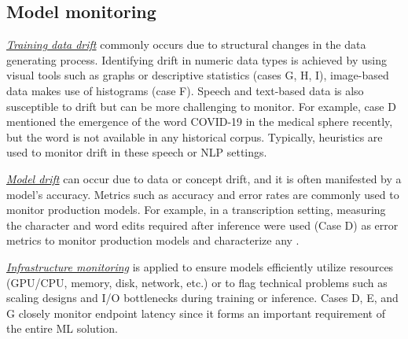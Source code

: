 

\subsection{Model monitoring} 

\underline{\emph{Training data drift}} commonly occurs due to structural changes in the data generating process. Identifying drift in numeric data types is \DIFdelbegin {}\DIFdelend achieved by using visual tools such as graphs or descriptive statistics (cases G, H, I), image-based data makes use of histograms (case F). Speech and text-based data is also susceptible to drift but can be more challenging to monitor. For example, case D mentioned the emergence of the word COVID-19 in the medical sphere recently, but the word is not available in any historical corpus. Typically, heuristics are used to monitor drift in these speech or NLP settings.

\underline{\emph{Model drift}} can occur due to data or concept drift, and it is often manifested by a \DIFdelbegin {}\DIFdelend model's \DIFaddbegin {}\DIFaddend accuracy. Metrics such as accuracy and error rates are commonly used to monitor production models. For example, in a transcription setting, measuring the character and word edits required after inference were used (Case D) as error metrics to monitor production models and characterize any \DIFdelbegin {}\DIFdelend \DIFaddbegin {}\DIFaddend .

\underline{\emph{Infrastructure monitoring}}
is applied to ensure models efficiently utilize resources (GPU/CPU, memory, disk, network, etc.) or to flag technical problems such as scaling designs and I/O bottlenecks during training or inference. Cases D, E, and G closely monitor endpoint latency since it forms an important requirement of the entire ML solution.


